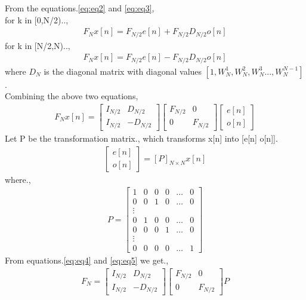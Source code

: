 \documentclass[journal,12pt,twocolumn]{IEEEtran}
\begin{document}
From the equations.\ref{eq:eq2} and \ref{eq:eq3},\\ for k in [0,N/2)..,
\begin{align}
    F_N x[n] = F_{N/2} e[n] +F_{N/2}D_{N/2} o[n]
\end{align}
for k in [N/2,N)..,
\begin{align}
    F_N x[n] = F_{N/2} e[n] -F_{N/2}D_{N/2} o[n]
\end{align}
where $D_N$ is the diagonal matrix with diagonal values $[1,W_N^1,W_N^2,W_N^3...,W_N^{N-1}]$.\\
Combining the above two equations, 
\begin{align}
    F_N x[n] = \begin{bmatrix}I_{N/2} & D_{N/2} \\ I_{N/2} & -D_{N/2} 
    \end{bmatrix} \begin{bmatrix}F_{N/2} & 0 \\ 0 & F_{N/2} 
    \end{bmatrix} \begin{bmatrix}e[n]\\ o[n] \label{eq:eq4}
    \end{bmatrix}
\end{align}
Let P be the transformation matrix., which transforms x[n] into [e[n] o[n]].
\begin{align}
    \begin{bmatrix}e[n]\\ o[n] 
    \end{bmatrix} = [P]_{N\times N}x[n] \label{eq:eq5}
\end{align}
where.,
\begin{align}
     P = \begin{bmatrix}1 & 0 & 0 & 0 &\hdots{} & 0\\
    0 & 0 & 1 & 0 & \hdots{} & 0\\ \vdots{} \\ 0 & 1 & 0 & 0 & \hdots{} & 0\\
    0 & 0 & 0 & 1 &\hdots{} & 0\\ \vdots{} \\
    0 & 0 & 0&0 &\hdots{} & 1
    \end{bmatrix}
\end{align}
From equations.\ref{eq:eq4} and \ref{eq:eq5} we get.,
\begin{align}
     F_N = \begin{bmatrix}I_{N/2} & D_{N/2} \\ I_{N/2} & -D_{N/2} 
    \end{bmatrix} \begin{bmatrix}F_{N/2} & 0 \\ 0 & F_{N/2} 
    \end{bmatrix}P 
\end{align}
\end{document}
